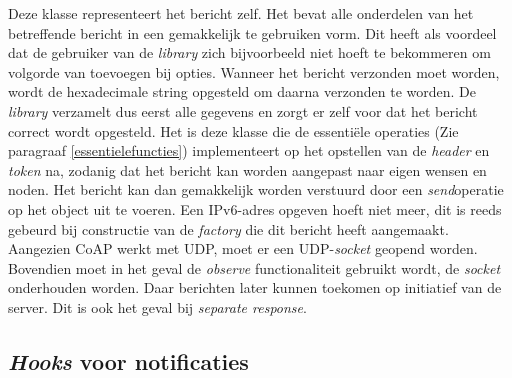 Deze klasse representeert het bericht zelf. Het bevat alle onderdelen van het betreffende bericht in een gemakkelijk te gebruiken vorm. Dit heeft als voordeel dat de gebruiker van de \textit{library} zich bijvoorbeeld niet hoeft te bekommeren om volgorde van toevoegen bij opties. Wanneer het bericht verzonden moet worden, wordt de hexadecimale string opgesteld om daarna verzonden te worden. De \textit{library} verzamelt dus eerst alle gegevens en zorgt er zelf voor dat het bericht correct wordt opgesteld. Het is deze klasse die de essenti\"{e}le operaties (Zie paragraaf \ref{essentielefuncties}) implementeert op het opstellen van de \textit{header} en \textit{token} na, zodanig dat het bericht kan worden aangepast naar eigen wensen en noden. Het bericht kan dan gemakkelijk worden verstuurd door een \textit{send}operatie op het object uit te voeren. Een IPv6-adres opgeven hoeft niet meer, dit is reeds gebeurd bij constructie van de \textit{factory} die dit bericht heeft aangemaakt. Aangezien CoAP werkt met UDP, moet er een UDP-\textit{socket} geopend worden. Bovendien moet in het geval de \textit{observe} functionaliteit gebruikt wordt, de \textit{socket} onderhouden worden. Daar berichten later kunnen toekomen op initiatief van de server. Dit is ook het geval bij \textit{separate response}.

\subsection{\textit{Hooks} voor notificaties} \label{observe_hooks}

